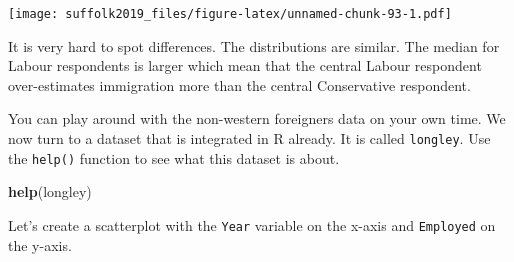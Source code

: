 \documentclass[]{article}
\newenvironment{Shaded}{\begin{snugshade}}{\end{snugshade}}
\newcommand{\CommentTok}[1]{\textcolor[rgb]{0.56,0.35,0.01}{\textit{#1}}}
\newcommand{\DataTypeTok}[1]{\textcolor[rgb]{0.13,0.29,0.53}{#1}}
\newcommand{\DecValTok}[1]{\textcolor[rgb]{0.00,0.00,0.81}{#1}}
\newcommand{\KeywordTok}[1]{\textcolor[rgb]{0.13,0.29,0.53}{\textbf{#1}}}
\newcommand{\NormalTok}[1]{#1}
\newcommand{\OperatorTok}[1]{\textcolor[rgb]{0.81,0.36,0.00}{\textbf{#1}}}
\newcommand{\OtherTok}[1]{\textcolor[rgb]{0.56,0.35,0.01}{#1}}
\newcommand{\StringTok}[1]{\textcolor[rgb]{0.31,0.60,0.02}{#1}}
\begin{document}
\begin{Shaded}
\end{Shaded}

\texttt{[image: suffolk2019\_files/figure-latex/unnamed-chunk-93-1.pdf]}

It is very hard to spot differences. The distributions are similar. The median for Labour respondents is larger which mean that the central Labour respondent over-estimates immigration more than the central Conservative respondent.

You can play around with the non-western foreigners data on your own time. We now turn to a dataset that is integrated in R already. It is called \texttt{longley}. Use the \texttt{help()} function to see what this dataset is about.

\begin{Shaded}
\begin{Highlighting}[]
\KeywordTok{help}\NormalTok{(longley)}
\end{Highlighting}
\end{Shaded}

Let's create a scatterplot with the \texttt{Year} variable on the x-axis and \texttt{Employed} on the y-axis.

\begin{Shaded}
\end{Shaded}
\end{document}

